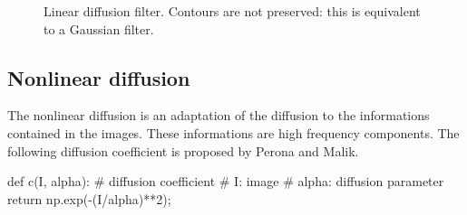 \begin{figure}[H]
\centering\caption{Linear diffusion filter. Contours are not preserved: this is equivalent to a Gaussian filter.}%
\hfill
{}\hfill
{}
\label{fig:pde:python:ld}
\vspace*{-10pt}
\end{figure}

\subsection{Nonlinear diffusion}
The nonlinear diffusion is an adaptation of the diffusion to the informations contained in the images. These informations are high frequency components. The following diffusion coefficient is proposed by Perona and Malik.
\begin{python}
def c(I, alpha):
    # diffusion coefficient
    # I: image
    # alpha: diffusion parameter
    return np.exp(-(I/alpha)**2);
\end{python}

